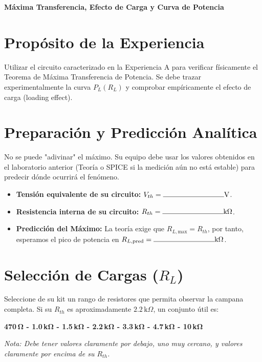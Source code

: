 \documentclass[11pt, a4paper]{article}
\begin{document}
\begin{tcolorbox}[colback=ucbblue!5!white, colframe=ucbblue, title=\textbf{Experiencia Integrada B — Guía de Laboratorio}]
    \centering \large \textbf{Máxima Transferencia, Efecto de Carga y Curva de Potencia}
\end{tcolorbox}

\section{Propósito de la Experiencia}
Utilizar el circuito caracterizado en la Experiencia A para verificar físicamente el Teorema de Máxima Transferencia de Potencia. Se debe trazar experimentalmente la curva $P_L(R_L)$ y comprobar empíricamente el efecto de carga (loading effect).

\section{Preparación y Predicción Analítica}
No se puede "adivinar" el máximo. Su equipo debe usar los valores obtenidos en el laboratorio anterior (Teoría o SPICE si la medición aún no está estable) para predecir dónde ocurrirá el fenómeno.

\begin{itemize}
    \item \textbf{Tensión equivalente de su circuito:} $V_{th} = \text{\rule{3cm}{0.4pt}} \text{V}$.
    \item \textbf{Resistencia interna de su circuito:} $R_{th} = \text{\rule{3cm}{0.4pt}} \text{k}\Omega$.
    \item \textbf{Predicción del Máximo:} La teoría exige que $R_{L,\text{max}} = R_{th}$, por tanto, esperamos el pico de potencia en $R_{L,\text{pred}} = \text{\rule{3cm}{0.4pt}} \text{k}\Omega$.
\end{itemize}

\section{Selección de Cargas ($R_L$)}
Seleccione de su kit un rango de resistores que permita observar la campana completa. Si su $R_{th}$ es aproximadamente $2.2\,\text{k}\Omega$, un conjunto útil es:
\begin{center}
    \textbf{470\,$\bm{\Omega}$ - 1.0\,k$\bm{\Omega}$ - 1.5\,k$\bm{\Omega}$ - 2.2\,k$\bm{\Omega}$ - 3.3\,k$\bm{\Omega}$ - 4.7\,k$\bm{\Omega}$ - 10\,k$\bm{\Omega}$}
\end{center}
\textit{Nota: Debe tener valores claramente por debajo, uno muy cercano, y valores claramente por encima de su $R_{th}$.}
\end{document}
